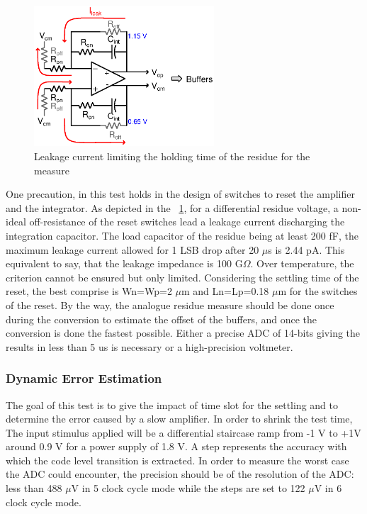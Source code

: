 \begin{figure}[htp]
    \centering
    \includegraphics[width=0.6\textwidth]{Chapter5/Figs/adc_chip/sd_integrator_leakage.ps}
    \caption{Leakage current limiting the holding time of the residue for the measure}
    \label{fig:adc-static-test-leakage}
\end{figure}

One precaution, in this test holds in the design of switches to reset the amplifier and the integrator. As depicted in the \figurename~\ref{fig:adc-static-test-leakage}, for a differential residue voltage, a non-ideal off-resistance of the reset switches lead a leakage current discharging the integration capacitor. The load capacitor of the residue being at least 200 fF, the maximum leakage current allowed for 1 LSB drop after 20 $\mu$s is 2.44 pA. This equivalent to say, that the leakage impedance is 100 G$\Omega$. Over temperature, the criterion cannot be ensured but only limited. Considering the settling time of the reset, the best comprise is Wn=Wp=2 $\mu$m and Ln=Lp=0.18 $\mu$m for the switches of the reset.
By the way, the analogue residue measure should be done once during the conversion to estimate the offset of the buffers, and once the conversion is done the fastest possible. Either a precise ADC of 14-bits giving the results in less than 5 us is necessary or a high-precision voltmeter.

    \subsubsection{Dynamic Error Estimation}
The goal of this test is to give the impact of time slot for the settling and to determine the error caused by a slow amplifier. In order to shrink the test time, The input stimulus applied will be a differential staircase ramp from -1 V to +1V around 0.9 V for a power supply of 1.8 V. A step represents the accuracy with which the code level transition is extracted. In order to measure the worst case the ADC could encounter, the precision should be of the resolution of the ADC: less than 488 $\mu$V in 5 clock cycle mode while the steps are set to 122 $\mu$V in 6 clock cycle mode.

